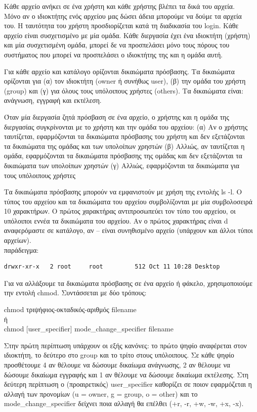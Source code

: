 Κάθε αρχείο ανήκει σε ένα χρήστη και κάθε χρήστης βλέπει τα δικά του αρχεία. Μόνο αν ο ιδιοκτήτης ενός αρχείου μας δώσει άδεια μπορούμε να
δούμε τα αρχεία του. Η ταυτότητα του χρήστη προσδιορίζεται κατά τη διαδικασία του login. Κάθε αρχείο είναι συσχετισμένο με μία ομάδα. Κάθε
διεργασία έχει ένα ιδιοκτήτη (χρήστη) και μία συσχετισμένη ομάδα, μπορεί δε να προσπελάσει μόνο τους πόρους του συστήματος που μπορεί να
προσπελάσει ο ιδιοκτήτης της και η ομάδα αυτή.

Για κάθε αρχείο και κατάλογο ορίζονται δικαιώματα πρόσβασης. Τα δικαιώματα ορίζονται για (α) τον ιδιοκτήτη (owner ή συνήθως user), (β) την
ομάδα του χρήστη (group) και (γ) για όλους τους υπόλοιπους χρήστες (others). Τα δικαιώματα είναι: ανάγνωση, εγγραφή και εκτέλεση.

Όταν μία διεργασία ζητά πρόσβαση σε ένα αρχείο, ο χρήστης και η ομάδα της διεργασίας συγκρίνονται με το χρήστη και την ομάδα του αρχείου: 
(α) Αν ο χρήστης ταυτίζεται, εφαρμόζονται τα δικαιώματα πρόσβασης του χρήστη και δεν εξετάζονται τα δικαιώματα της ομάδας και των υπολοίπων
χρηστών
(β) Αλλιώς, αν ταυτίζεται η ομάδα, εφαρμόζονται τα δικαιώματα πρόσβασης της ομάδας και δεν εξετάζονται τα δικαιώματα των υπολοίπων χρηστών
(γ) Αλλιώς, εφαρμόζονται τα δικαιώματα για τους υπόλοιπους χρήστες

Τα δικαιώματα πρόσβασης μπορούν να εμφανιστούν με χρήση της εντολής ls -l. Ο τύπος του αρχείου και τα δικαιώματα του αρχείου συμβολίζονται
με μία συμβολοσειρά 10
χαρακτήρων. Ο πρώτος χαρακτήρας αντιπροσωπεύει τον τύπο του αρχείου, οι υπόλοιποι εννέα τα δικαιώματα του αρχείου. Αν ο πρώτος χαρακτήρας
είναι d αναφερόμαστε σε
κατάλογο, αν – είναι συνηθισμένο αρχείο (υπάρχουν και άλλοι τύποι αρχείων).\\
παράδειγμα: 
\begin{lstlisting}
drwxr-xr-x   2 root     root         512 Oct 11 10:28 Desktop
\end{lstlisting}



Για να αλλάξουμε τα δικαιώματα πρόσβασης σε ένα αρχείο ή φάκελο, χρησιμοποιούμε την εντολή chmod. Συντάσσεται με δύο τρόπους:
\begin{center}
	chmod τριψήφιος-οκταδικός-αριθμός filename\\
	ή\\
	chmod [user\_specifier] mode\_change\_specifier filename
\end{center}

Στην πρώτη περίπτωση υπάρχουν οι εξής κανόνες: το πρώτο ψηφίο αναφέρεται στον ιδιοκτήτη, το δεύτερο στο group και το τρίτο στους υπόλοιπους.
Σε κάθε ψηφίο
προσθέτουμε 4 αν θέλουμε να δώσουμε δικαίωμα ανάγνωσης, 2 αν θέλουμε να δώσουμε δικαίωμα εγγραφής και 1 αν θέλουμε να δώσουμε δικαίωμα
εκτέλεσης.
Στη δεύτερη περίπτωση ο (προαιρετικός) user\_specifier καθορίζει σε ποιον εφαρμόζεται η αλλαγή των προνομίων (u = owner, g = group, o =
other) και το mode\_\-change\_specifier δείχνει ποια αλλαγή θα επέλθει (+r, -r, +w, -w, +x, -x). \\

